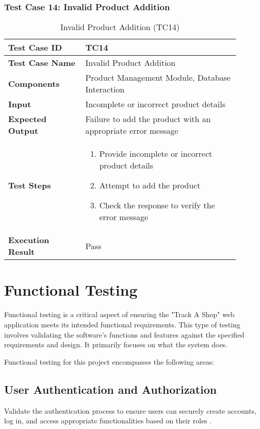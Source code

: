 \begin{table}[h]
	\subsubsection{Test Case 14: Invalid Product Addition}
	\centering
	\caption{Invalid Product Addition (TC14)}
	\begin{tabular}{|p{0.3\linewidth}|p{0.6\linewidth}|}
		\hline
		\textbf{Test Case ID} & TC14 \\
		\hline
		\textbf{Test Case Name} & Invalid Product Addition \\
		\hline
		\textbf{Components} & Product Management Module, Database Interaction \\
		\hline
		\textbf{Input} & Incomplete or incorrect product details \\
		\hline
		\textbf{Expected Output} & Failure to add the product with an appropriate error message \\
		\hline
		\textbf{Test Steps} & 
		\begin{enumerate}
			\item Provide incomplete or incorrect product details
			\item Attempt to add the product
			\item Check the response to verify the error message
		\end{enumerate} \\
		\hline
		\textbf{Execution Result} & Pass \\
		\hline
	\end{tabular}
\end{table}





\pagebreak
\section{Functional Testing}

Functional testing is a critical aspect of ensuring the "Track A Shop" web application meets its intended functional requirements. This type of testing involves validating the software's functions and features against the specified requirements and design. It primarily focuses on what the system does.

Functional testing for this project encompasses the following areas:

\subsection{User Authentication and Authorization} Validate the authentication process to ensure users can securely create accounts, log in, and access appropriate functionalities based on their roles \citep{oauth-spec}.

